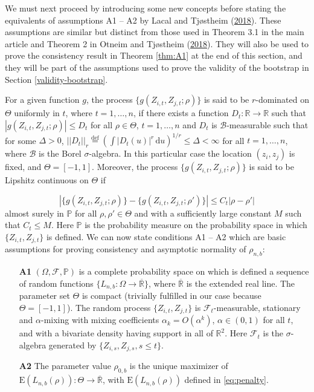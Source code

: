 \documentclass[
  12pt,
  letterpaper]{article}
\numberwithin{equation}{section}
\newcommand{\E}{\textrm{E}}
\newcommand{\di}{\,\textrm{d}}
\begin{document}
We must next proceed by introducing some new concepts before stating the equivalents of assumptions A1 -- A2 by Lacal and Tjøstheim (\protect\hyperlink{ref-lacal2018estimating}{2018}). These assumptions are similar but distinct from those used in Theorem 3.1 in the main article and Theorem 2 in Otneim and Tjøstheim (\protect\hyperlink{ref-otneim2017conditional}{2018}). They will also be used to prove the consistency result in Theorem \ref{thm:A1} at the end of this section, and they will be part of the assumptions used to prove the validity of the bootstrap in Section \ref{validity-bootstrap}.

For a given function \(g\), the process \(\{g(Z_{i,t}, Z_{j,t}; \rho)\}\) is said to be \(r\)-dominated on \(\Theta\) uniformly in \(t\), where \(t = 1,\ldots,n\), if there exists a function \(D_t: \mathbb{R} \rightarrow \mathbb{R}\) such that \(|g(Z_{i,t}, Z_{j,t}; \rho)| \leq D_t\) for all \(\rho \in \Theta\), \(t = 1,\ldots, n\) and \(D_t\) is \(\mathcal{B}\)-measurable such that for some \(\Delta > 0\), \(||D_t||_r \stackrel{\textrm{def}}{=} \left(\int |D_t(u)|^r\di u\right)^{1/r} \leq \Delta < \infty\) for all \(t = 1,\ldots,n\), where \(\mathcal{B}\) is the Borel \(\sigma\)-algebra. In this particular case the location \((z_i, z_j)\) is fixed, and \(\Theta = [-1,1]\). Moreover, the process \(\{g(Z_{i,t}, Z_{j,t}; \rho)\}\) is said to be Lipshitz continuous on \(\Theta\) if

\[|\{g(Z_{i,t}, Z_{j,t}; \rho)\} - \{g(Z_{i,t}, Z_{j,t}; \rho')\}| \leq C_t|\rho - \rho'|\]
almost surely in \(\mathbb{P}\) for all \(\rho,\rho'\in\Theta\) and with a sufficiently large constant \(M\) such that \(C_t\leq M\). Here \(\mathbb{P}\) is the probability measure on the probability space in which \(\{Z_{i,t}, Z_{j,t}\}\) is defined. We can now state conditions A1 -- A2 which are basic assumptions for proving consistency and asymptotic normality of \(\rho_{n,b}\):

\begin{itemize}
\item[\textbf{A1}] $(\Omega, \mathcal{F}, \mathbb{P})$ is a complete probability space on which is defined a sequence of random functions $\{L_{n,b}: \Omega\rightarrow\overline{\mathbb{R}}\}$, where $\overline{\mathbb{R}}$ is the extended real line. The parameter set $\Theta$ is compact (trivially fulfilled in our case because $\Theta = [-1,1]$). The random process $\{Z_{i,t}, Z_{j,t}\}$ is $\mathcal{F}_t$-measurable, stationary and $\alpha$-mixing with mixing coefficients $\alpha_k = O(\alpha^k)$, $\alpha \in (0,1)$ for all $t$, and with a bivariate density having support in all of $\mathbb{R}^2$. Here $\mathcal{F}_t$ is the $\sigma$-algebra generated by $\{Z_{i,s}, Z_{j,s}, s \leq t\}$.
\item[\textbf{A2}] The parameter value $\rho_{0,b}$ is the unique maximizer of $\E(L_{n,b}(\rho)): \Theta \rightarrow \overline{\mathbb{R}}$, with $\E(L_{n,b}(\rho))$ defined in \eqref{eq:penalty}.
\end{itemize}
\end{document}
